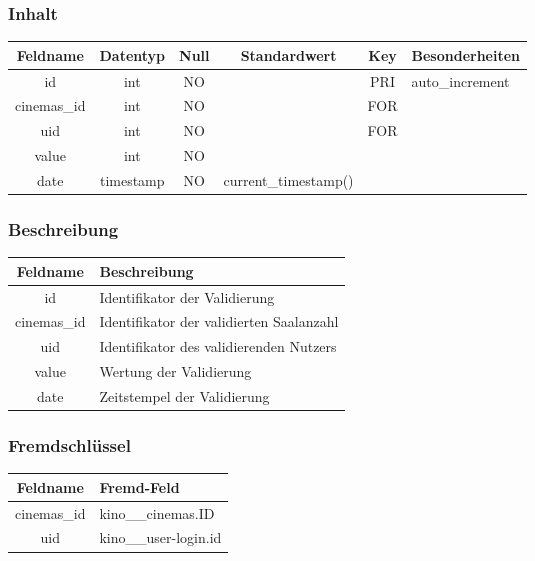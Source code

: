 \subsubsection{Inhalt}
\begin{table}[H]
	\begin{tabular}{|c|c|c|c|c|p{3.5cm}|}
		\hline
		\textbf{Feldname} & \textbf{Datentyp} & \textbf{Null} & \textbf{Standardwert} & \textbf{Key}   & \textbf{Besonderheiten} \\ \hline
		id & int & NO &  & PRI & auto\_increment \\ \hline
		cinemas\_id & int & NO &  & FOR & \\ \hline
		uid & int & NO &  & FOR & \\ \hline
		value & int & NO &  &  & \\ \hline
		date & timestamp & NO & current\_timestamp() &  & \\ \hline
	\end{tabular}
\end{table}
\subsubsection{Beschreibung}
\begin{table}[H]
	\begin{tabular}{|c|p{12cm}|}
		\hline
		\textbf{Feldname} & \textbf{Beschreibung} \\ \hline
		id & Identifikator der Validierung \\ \hline
		cinemas\_id & Identifikator der validierten Saalanzahl \\ \hline
		uid & Identifikator des validierenden Nutzers \\ \hline
		value & Wertung der Validierung \\ \hline
		date & Zeitstempel der Validierung \\ \hline
	\end{tabular}
\end{table}
\subsubsection{Fremdschlüssel}
\begin{table}[H]
	\begin{tabular}{|c|p{12.5cm}|}
		\hline
		\textbf{Feldname} & \textbf{Fremd-Feld} \\ \hline
		cinemas\_id & kino\_\_cinemas.ID \\ \hline
		uid & kino\_\_user-login.id \\ \hline
	\end{tabular}
\end{table}
